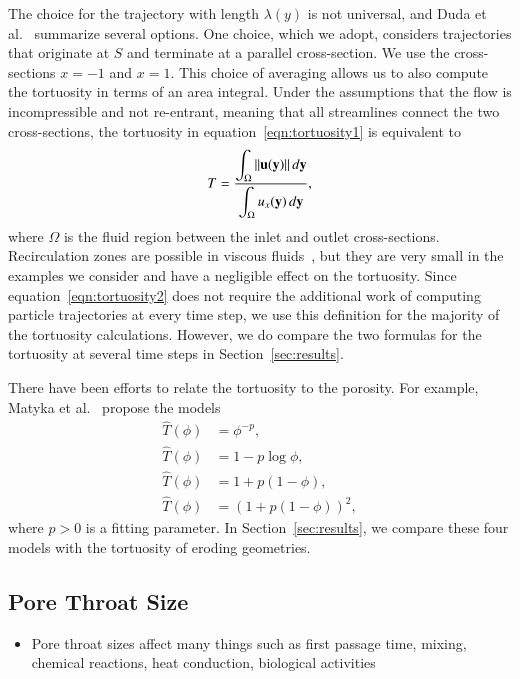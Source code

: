 \documentclass[preprint, 10pt]{elsarticle}
\begin{document}
The choice for the trajectory with length $\lambda(y)$ is not universal,
and Duda et al.~\cite{dud-koz-mat2011} summarize several options. One
choice, which we adopt, considers trajectories that originate at $S$ and
terminate at a parallel cross-section.  We use the cross-sections $x=-1$
and $x=1$.  This choice of averaging allows us to also compute the
tortuosity in terms of an area integral.  Under the assumptions that the
flow is incompressible and not re-entrant, meaning that all streamlines
connect the two cross-sections, the tortuosity in
equation~\eqref{eqn:tortuosity1} is equivalent to~\cite{dud-koz-mat2011}
\begin{align}
  T = \frac{\displaystyle\int_\Omega \|{\mathbf{u}}({\mathbf{y}})\|\, d{\mathbf{y}}}
           {\displaystyle\int_\Omega u_x({\mathbf{y}})\, d{\mathbf{y}}},
  \label{eqn:tortuosity2}
\end{align}
where $\Omega$ is the fluid region between the inlet and outlet
cross-sections.  Recirculation zones are possible in viscous
fluids~\cite{hig1985}, but they are very small in the examples we
consider and have a negligible effect on the tortuosity.  Since
equation~\eqref{eqn:tortuosity2} does not require the additional work of
computing particle trajectories at every time step, we use this
definition for the majority of the tortuosity calculations.  However, we
do compare the two formulas for the tortuosity at several time steps in
Section~\ref{sec:results}.

There have been efforts to relate the tortuosity to the porosity.  For
example, Matyka et al.~\cite{mat-kha-koz2008} propose the models
\begin{subequations}
  \label{eqn:tortuosityModels}
  \begin{align}
    \widehat{T}(\phi) &= \phi^{-p}, \\
    \widehat{T}(\phi) &= 1-p \log \phi, \\
    \widehat{T}(\phi) &= 1+p (1-\phi), \\
    \widehat{T}(\phi) &= (1+p (1-\phi))^2, 
  \end{align}
\end{subequations}
where $p>0$ is a fitting parameter.  In Section~\ref{sec:results}, we
compare these four models with the tortuosity of eroding geometries.

\subsection{Pore Throat Size}
\begin{itemize}
  \item Pore throat sizes affect many things such as first passage time,
  mixing, chemical reactions, heat conduction, biological activities
\end{itemize}
\end{document}
